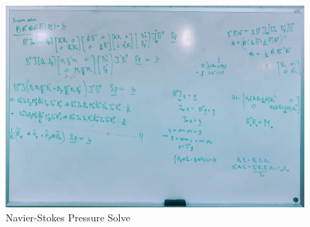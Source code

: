 \begin{figure}[h!]
    \centering
    \includegraphics[width=1.0\textwidth]{fig/presNS.jpg}
    \caption{Navier-Stokes Pressure Solve}
    \label{fig:rtt}
\end{figure}
